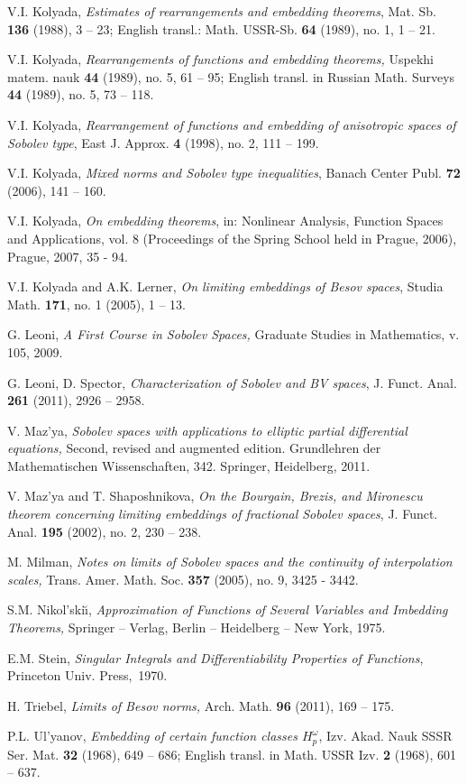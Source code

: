 \documentclass[12pt,twoside,reqno]{amsart}
\numberwithin{equation}{section}
\theoremstyle{definition}
\numberwithin{equation}{section}
\begin{document}
\begin{thebibliography}{99}
V.I. Kolyada, {\it Estimates of rearrangements and embedding
theorems}, Mat. Sb. {\bf 136} (1988), 3 -- 23; English transl.:
Math. USSR-Sb. {\bf 64} (1989), no. 1, 1 -- 21.

V.I. Kolyada, {\it Rearrangements of functions and embedding
theorems,} Uspekhi matem. nauk {\bf 44} (1989), no. 5, 61 -- 95;
English transl. in Russian Math. Surveys {\bf 44} (1989), no. 5, 73
-- 118.

V.I. Kolyada, {\it Rearrangement of functions and embedding of
anisotropic spaces of Sobolev type}, East J. Approx. {\bf 4} (1998),
no. 2, 111 -- 199.

  V.I. Kolyada, {\it Mixed norms and Sobolev type
inequalities}, Banach Center Publ. {\bf 72} (2006), 141 -- 160.

  V.I. Kolyada, {\it On embedding theorems}, in:
Nonlinear Analysis, Function Spaces and Applications, vol. 8
(Proceedings of the Spring School held in Prague, 2006), Prague,
2007, 35 - 94.

V.I. Kolyada and A.K. Lerner, {\it On limiting embeddings of Besov
spaces}, Studia Math. {\bf 171}, no. 1 (2005), 1 -- 13.

 G. Leoni, {\it A First Course in Sobolev Spaces,}
Graduate Studies in Mathematics, v. 105, 2009.

 G. Leoni, D. Spector, {\it Characterization of
Sobolev and BV spaces}, J. Funct. Anal. {\bf 261} (2011), 2926 --
2958.

 V. Maz'ya, {\it Sobolev spaces with applications to elliptic partial differential equations,} Second, revised and augmented edition.
 Grundlehren der Mathematischen Wissenschaften, 342. Springer, Heidelberg, 2011.

V. Maz'ya and T. Shaposhnikova, {\it On the Bourgain, Brezis, and
Mironescu theorem concerning limiting embeddings of fractional
Sobolev spaces}, J. Funct. Anal. {\bf 195} (2002), no. 2, 230 --
238.

 M. Milman, {\it Notes on limits of Sobolev spaces and the continuity of interpolation scales,} Trans. Amer. Math. Soc. {\bf 357} (2005), no. 9, 3425 - 3442.

 S.M. Nikol'ski\u\i, {\it Approximation of Functions of Several
 Variables and Imbedding Theorems,} Springer -- Verlag, Berlin -- Heidelberg -- New York,
 1975.

 E.M. Stein, {\it Singular Integrals and
Differentiability Properties of Functions}, Princeton Univ.
Press,~1970.

 H. Triebel, {\it Limits of Besov norms,} Arch. Math.
{\bf 96} (2011), 169 -- 175.

 P.L. Ul'yanov, {\it Embedding of certain function classes
$H_p^\omega$}, Izv. Akad. Nauk SSSR Ser. Mat. {\bf 32} (1968), 649
-- 686; English transl. in Math. USSR Izv. {\bf 2} (1968), 601 --
637.

\end{thebibliography}
\end{document}
